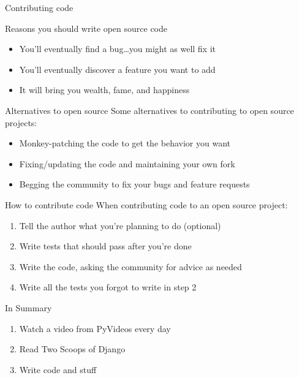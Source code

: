 \documentclass[xcolor=dvipsnames]{beamer}
\begin{document}
\begin{section}{Contributing code}

  \begin{frame}{Reasons you should write open source code}
    \begin{itemize}
      \item You'll eventually find a bug\ldots you might as well fix it
      \item You'll eventually discover a feature you want to add
      \item It will bring you wealth, fame, and happiness
    \end{itemize}
  \end{frame}

  \begin{frame}{Alternatives to open source}
    Some alternatives to contributing to open source projects:

    \begin{itemize}
      \item Monkey-patching the code to get the behavior you want
      \item Fixing/updating the code and maintaining your own fork
      \item Begging the community to fix your bugs and feature requests
    \end{itemize}
  \end{frame}

  \begin{frame}{How to contribute code}
    When contributing code to an open source project:

    \begin{enumerate}
      \item Tell the author what you're planning to do (optional)
      \item Write tests that should pass after you're done
      \item Write the code, asking the community for advice as needed
      \pause
      \item Write all the tests you forgot to write in step 2
    \end{enumerate}
  \end{frame}

  \begin{frame}{In Summary}

    \begin{enumerate}
      \item Watch a video from PyVideos every day
      \item Read Two Scoops of Django
      \item Write code and stuff
    \end{enumerate}
  \end{frame}

\end{section}
\end{document}
